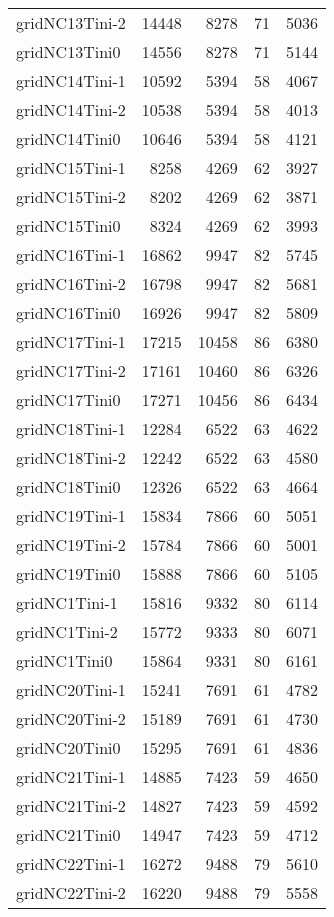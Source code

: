 \begin{longtable}{lrrrr}
gridNC13Tini-2 & 14448 & 8278 & 71 & 5036 \\
gridNC13Tini0 & 14556 & 8278 & 71 & 5144 \\
gridNC14Tini-1 & 10592 & 5394 & 58 & 4067 \\
gridNC14Tini-2 & 10538 & 5394 & 58 & 4013 \\
gridNC14Tini0 & 10646 & 5394 & 58 & 4121 \\
gridNC15Tini-1 & 8258 & 4269 & 62 & 3927 \\
gridNC15Tini-2 & 8202 & 4269 & 62 & 3871 \\
gridNC15Tini0 & 8324 & 4269 & 62 & 3993 \\
gridNC16Tini-1 & 16862 & 9947 & 82 & 5745 \\
gridNC16Tini-2 & 16798 & 9947 & 82 & 5681 \\
gridNC16Tini0 & 16926 & 9947 & 82 & 5809 \\
gridNC17Tini-1 & 17215 & 10458 & 86 & 6380 \\
gridNC17Tini-2 & 17161 & 10460 & 86 & 6326 \\
gridNC17Tini0 & 17271 & 10456 & 86 & 6434 \\
gridNC18Tini-1 & 12284 & 6522 & 63 & 4622 \\
gridNC18Tini-2 & 12242 & 6522 & 63 & 4580 \\
gridNC18Tini0 & 12326 & 6522 & 63 & 4664 \\
gridNC19Tini-1 & 15834 & 7866 & 60 & 5051 \\
gridNC19Tini-2 & 15784 & 7866 & 60 & 5001 \\
gridNC19Tini0 & 15888 & 7866 & 60 & 5105 \\
gridNC1Tini-1 & 15816 & 9332 & 80 & 6114 \\
gridNC1Tini-2 & 15772 & 9333 & 80 & 6071 \\
gridNC1Tini0 & 15864 & 9331 & 80 & 6161 \\
gridNC20Tini-1 & 15241 & 7691 & 61 & 4782 \\
gridNC20Tini-2 & 15189 & 7691 & 61 & 4730 \\
gridNC20Tini0 & 15295 & 7691 & 61 & 4836 \\
gridNC21Tini-1 & 14885 & 7423 & 59 & 4650 \\
gridNC21Tini-2 & 14827 & 7423 & 59 & 4592 \\
gridNC21Tini0 & 14947 & 7423 & 59 & 4712 \\
gridNC22Tini-1 & 16272 & 9488 & 79 & 5610 \\
gridNC22Tini-2 & 16220 & 9488 & 79 & 5558 \\

\end{longtable}
